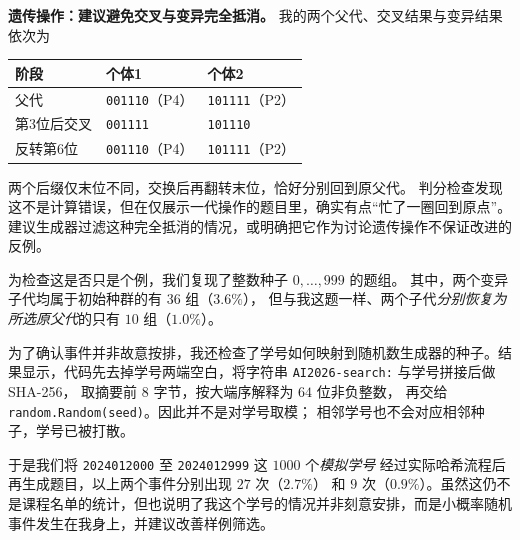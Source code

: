 \documentclass[utf8]{ctexart}
\theoremstyle{mystyle}
\begin{document}
\clearpage
\noindent\textbf{遗传操作：建议避免交叉与变异完全抵消。}
我的两个父代、交叉结果与变异结果依次为
\begin{center}
\begin{tabular}{lll}
\toprule
阶段 & 个体1 & 个体2\\
\midrule
父代 & \texttt{001110}（P4） & \texttt{101111}（P2）\\
第3位后交叉 & \texttt{001111} & \texttt{101110}\\
反转第6位 & \texttt{001110}（P4） & \texttt{101111}（P2）\\
\bottomrule
\end{tabular}
\end{center}
两个后缀仅末位不同，交换后再翻转末位，恰好分别回到原父代。
判分检查发现这不是计算错误，但在仅展示一代操作的题目里，确实有点“忙了一圈回到原点”。
建议生成器过滤这种完全抵消的情况，或明确把它作为讨论遗传操作不保证改进的反例。

为检查这是否只是个例，我们复现了整数种子 $0,\ldots,999$ 的题组。
其中，两个变异子代均属于初始种群的有 $36$ 组（$3.6\%$），
但与我这题一样、两个子代\emph{分别恢复为所选原父代}的只有 $10$ 组（$1.0\%$）。

为了确认事件并非故意按排，我还检查了学号如何映射到随机数生成器的种子。结果显示，代码先去掉学号两端空白，将字符串
\texttt{AI2026-search:} 与学号拼接后做 SHA-256，
取摘要前 $8$ 字节，按大端序解释为 $64$ 位非负整数，
再交给 \texttt{random.Random(seed)}。因此并不是对学号取模；
相邻学号也不会对应相邻种子，学号已被打散。

于是我们将
\texttt{2024012000} 至 \texttt{2024012999} 这 $1000$ 个\emph{模拟学号}
经过实际哈希流程后再生成题目，以上两个事件分别出现 $27$ 次（$2.7\%$）
和 $9$ 次（$0.9\%$）。虽然这仍不是课程名单的统计，但也说明了我这个学号的情况并非刻意安排，而是小概率随机事件发生在我身上，并建议改善样例筛选。

\end{document}
